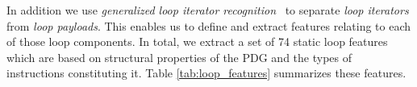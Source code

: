 In addition we use \textit{generalized loop iterator recognition}~\cite{Manilov:2018:GPI:3178372.3179511} to separate \textit{loop iterators} from \textit{loop payloads}. This enables us to define and extract features relating to each of those loop components. In total, we extract a set of 74 static loop features which are based on structural properties of the PDG and the types of instructions constituting it. Table \ref{tab:loop_features} summarizes these features.\newline\null
